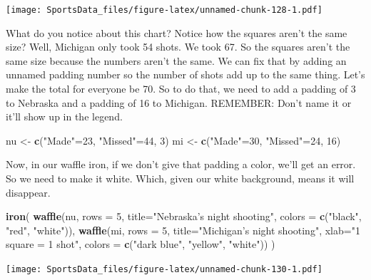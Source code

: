 \documentclass[]{book}
\newenvironment{Shaded}{\begin{snugshade}}{\end{snugshade}}
\newcommand{\KeywordTok}[1]{\textcolor[rgb]{0.13,0.29,0.53}{\textbf{#1}}}
\newcommand{\DataTypeTok}[1]{\textcolor[rgb]{0.13,0.29,0.53}{#1}}
\newcommand{\DecValTok}[1]{\textcolor[rgb]{0.00,0.00,0.81}{#1}}
\newcommand{\StringTok}[1]{\textcolor[rgb]{0.31,0.60,0.02}{#1}}
\newcommand{\NormalTok}[1]{#1}
\begin{document}
\texttt{[image: SportsData\_files/figure-latex/unnamed-chunk-128-1.pdf]}

What do you notice about this chart? Notice how the squares aren't the
same size? Well, Michigan only took 54 shots. We took 67. So the squares
aren't the same size because the numbers aren't the same. We can fix
that by adding an unnamed padding number so the number of shots add up
to the same thing. Let's make the total for everyone be 70. So to do
that, we need to add a padding of 3 to Nebraska and a padding of 16 to
Michigan. REMEMBER: Don't name it or it'll show up in the legend.

\begin{Shaded}
\begin{Highlighting}[]
\NormalTok{nu <-}\StringTok{ }\KeywordTok{c}\NormalTok{(}\StringTok{"Made"}\NormalTok{=}\DecValTok{23}\NormalTok{, }\StringTok{"Missed"}\NormalTok{=}\DecValTok{44}\NormalTok{, }\DecValTok{3}\NormalTok{)}
\NormalTok{mi <-}\StringTok{ }\KeywordTok{c}\NormalTok{(}\StringTok{"Made"}\NormalTok{=}\DecValTok{30}\NormalTok{, }\StringTok{"Missed"}\NormalTok{=}\DecValTok{24}\NormalTok{, }\DecValTok{16}\NormalTok{)}
\end{Highlighting}
\end{Shaded}

Now, in our waffle iron, if we don't give that padding a color, we'll
get an error. So we need to make it white. Which, given our white
background, means it will disappear.

\begin{Shaded}
\begin{Highlighting}[]
\KeywordTok{iron}\NormalTok{(}
 \KeywordTok{waffle}\NormalTok{(nu, }\DataTypeTok{rows =} \DecValTok{5}\NormalTok{, }\DataTypeTok{title=}\StringTok{"Nebraska's night shooting"}\NormalTok{, }\DataTypeTok{colors =} \KeywordTok{c}\NormalTok{(}\StringTok{"black"}\NormalTok{, }\StringTok{"red"}\NormalTok{, }\StringTok{"white"}\NormalTok{)),}
 \KeywordTok{waffle}\NormalTok{(mi, }\DataTypeTok{rows =} \DecValTok{5}\NormalTok{, }\DataTypeTok{title=}\StringTok{"Michigan's night shooting"}\NormalTok{, }\DataTypeTok{xlab=}\StringTok{"1 square = 1 shot"}\NormalTok{, }\DataTypeTok{colors =} \KeywordTok{c}\NormalTok{(}\StringTok{"dark blue"}\NormalTok{, }\StringTok{"yellow"}\NormalTok{, }\StringTok{"white"}\NormalTok{))}
\NormalTok{)}
\end{Highlighting}
\end{Shaded}

\texttt{[image: SportsData\_files/figure-latex/unnamed-chunk-130-1.pdf]}
\end{document}
